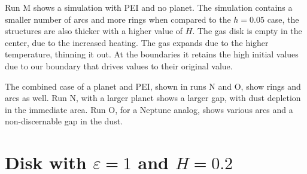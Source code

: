 \documentclass[onecolumn]{report}
\newcommand{\epsi}{\varepsilon}
\begin{document}
Run M shows a simulation with PEI and no planet. The simulation contains a smaller number of arcs and more rings when compared to the $h=0.05$ case, the structures are also thicker with a higher value of $H$. The gas disk is empty in the center, due to the increased heating. The gas expands due to the higher temperature, thinning it out. At the boundaries it retains the high initial values due to our boundary that drives values to their original value.

The combined case of a planet and PEI, shown in runs N and O, show rings and arcs as well. Run N, with a larger planet shows a larger gap, with dust depletion in the immediate area. Run O, for a Neptune analog, shows various arcs and a non-discernable gap in the dust.

\section{Disk with $\epsi=1$ and $H=0.2$}
\end{document}
